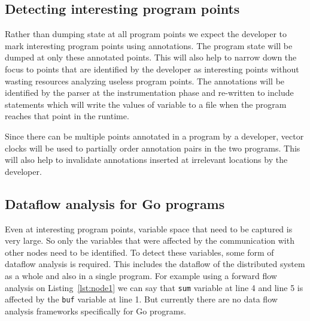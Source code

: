 \subsection{Detecting interesting program points}

Rather than dumping state at all program points we expect the
developer to mark interesting program points using annotations. The
program state will be dumped at only these annotated points. This will
also help to narrow down the focus to points that are identified by
the developer as interesting points without wasting resources
analyzing useless program points. The annotations will be identified
by the parser at the instrumentation phase and re-written to include
statements which will write the values of variable to a file when the
program reaches that point in the runtime.

Since there can be multiple points annotated in a program by a
developer, vector clocks will be used to partially order annotation
pairs in the two programs. This will also help to invalidate
annotations inserted at irrelevant locations by the developer.

\subsection{Dataflow analysis for Go programs}

Even at interesting program points, variable space that need to be
captured is very large. So only the variables that were affected by
the communication with other nodes need to be identified. To detect
these variables, some form of dataflow analysis is required. This
includes the dataflow of the distributed system as a whole and also in
a single program. For example using a forward flow analysis on Listing~\ref{lst:node1} we can say that \texttt{sum} variable at line 4 and line 5 is affected by the \texttt{buf} variable at line 1. But currently there are no data flow analysis
frameworks specifically for Go programs.


